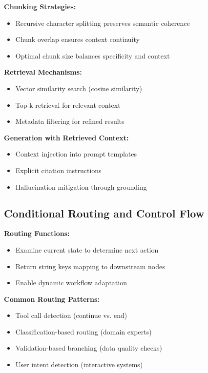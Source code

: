 \documentclass[12pt,a4paper]{article}
\begin{document}
\textbf{Chunking Strategies:}
\begin{itemize}
    \item Recursive character splitting preserves semantic coherence
    \item Chunk overlap ensures context continuity
    \item Optimal chunk size balances specificity and context
\end{itemize}

\textbf{Retrieval Mechanisms:}
\begin{itemize}
    \item Vector similarity search (cosine similarity)
    \item Top-k retrieval for relevant context
    \item Metadata filtering for refined results
\end{itemize}

\textbf{Generation with Retrieved Context:}
\begin{itemize}
    \item Context injection into prompt templates
    \item Explicit citation instructions
    \item Hallucination mitigation through grounding
\end{itemize}

\subsection{Conditional Routing and Control Flow}

\textbf{Routing Functions:}
\begin{itemize}
    \item Examine current state to determine next action
    \item Return string keys mapping to downstream nodes
    \item Enable dynamic workflow adaptation
\end{itemize}

\textbf{Common Routing Patterns:}
\begin{itemize}
    \item Tool call detection (continue vs. end)
    \item Classification-based routing (domain experts)
    \item Validation-based branching (data quality checks)
    \item User intent detection (interactive systems)
\end{itemize}
\end{document}
